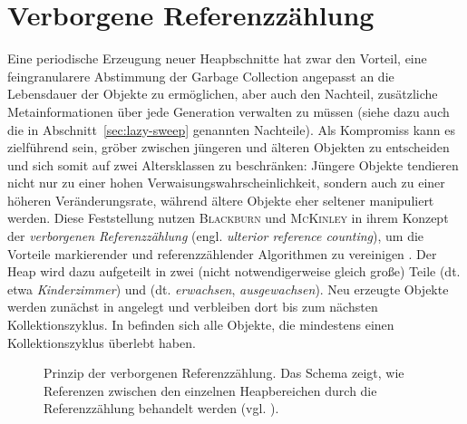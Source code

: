 

\section{Verborgene Referenzzählung}
\label{sec:ulterior}

Eine periodische Erzeugung neuer Heapbschnitte hat zwar den Vorteil, eine feingranularere Abstimmung der Garbage Collection angepasst an die Lebensdauer der Objekte zu ermöglichen, aber auch den Nachteil, zusätzliche Metainformationen über jede Generation verwalten zu müssen (siehe dazu auch die in Abschnitt~\ref{sec:lazy-sweep} genannten Nachteile).
Als Kompromiss kann es zielführend sein, gröber zwischen jüngeren und älteren Objekten zu entscheiden und sich somit auf zwei Altersklassen zu beschränken:
Jüngere Objekte tendieren nicht nur zu einer hohen Verwaisungswahrscheinlichkeit, sondern auch zu einer höheren Veränderungsrate, während ältere Objekte eher seltener manipuliert werden.
Diese Feststellung nutzen \textsc{Blackburn} und \textsc{McKinley} in ihrem Konzept der \textit{verborgenen Referenzzählung} (engl. \textit{ulterior reference counting}), um die Vorteile markierender und referenzzählender Algorithmen zu vereinigen \cite{blackburn2003}.
Der Heap wird dazu aufgeteilt in zwei (nicht notwendigerweise gleich große) Teile \Nursery (dt. etwa \textit{Kinderzimmer}) und \Mature (dt. \textit{erwachsen}, \textit{ausgewachsen}).
Neu erzeugte Objekte werden zunächst in \Nursery angelegt und verbleiben dort bis zum nächsten Kollektionszyklus.
In \Mature befinden sich alle Objekte, die mindestens einen Kollektionszyklus überlebt haben.

\begin{figure}[h]
	\centering
	
	\caption[Prinzip der verborgenen Referenzzählung]{Prinzip der verborgenen Referenzzählung. Das Schema zeigt, wie Referenzen zwischen den einzelnen Heapbereichen durch die Referenzzählung behandelt werden (vgl. \cite[S. 346]{blackburn2003}).}
	\label{fig:ulterior-principle}
\end{figure}

